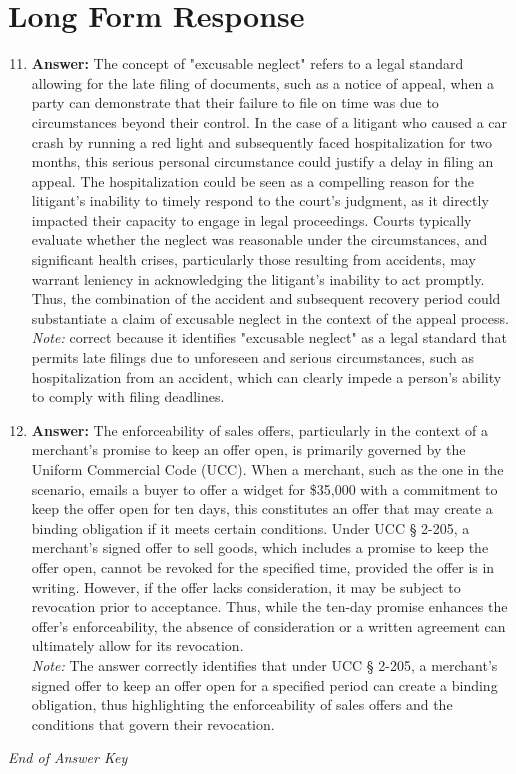 \documentclass[12pt]{article}
\begin{document}
\section*{Long Form Response}
\begin{enumerate}[label=\arabic*.]
\setcounter{enumi}{10}
\item \textbf{Answer:} The concept of "excusable neglect" refers to a legal standard allowing for the late filing of documents, such as a notice of appeal, when a party can demonstrate that their failure to file on time was due to circumstances beyond their control. In the case of a litigant who caused a car crash by running a red light and subsequently faced hospitalization for two months, this serious personal circumstance could justify a delay in filing an appeal. The hospitalization could be seen as a compelling reason for the litigant's inability to timely respond to the court's judgment, as it directly impacted their capacity to engage in legal proceedings. Courts typically evaluate whether the neglect was reasonable under the circumstances, and significant health crises, particularly those resulting from accidents, may warrant leniency in acknowledging the litigant's inability to act promptly. Thus, the combination of the accident and subsequent recovery period could substantiate a claim of excusable neglect in the context of the appeal process.
\\ \textit{Note:} correct because it identifies "excusable neglect" as a legal standard that permits late filings due to unforeseen and serious circumstances, such as hospitalization from an accident, which can clearly impede a person's ability to comply with filing deadlines.
\item \textbf{Answer:} The enforceability of sales offers, particularly in the context of a merchant's promise to keep an offer open, is primarily governed by the Uniform Commercial Code (UCC). When a merchant, such as the one in the scenario, emails a buyer to offer a widget for \$35,000 with a commitment to keep the offer open for ten days, this constitutes an offer that may create a binding obligation if it meets certain conditions. Under UCC § 2-205, a merchant's signed offer to sell goods, which includes a promise to keep the offer open, cannot be revoked for the specified time, provided the offer is in writing. However, if the offer lacks consideration, it may be subject to revocation prior to acceptance. Thus, while the ten-day promise enhances the offer's enforceability, the absence of consideration or a written agreement can ultimately allow for its revocation.
\\ \textit{Note:} The answer correctly identifies that under UCC § 2-205, a merchant's signed offer to keep an offer open for a specified period can create a binding obligation, thus highlighting the enforceability of sales offers and the conditions that govern their revocation.
\end{enumerate}

\vfill
\noindent\textit{End of Answer Key}
\end{document}
